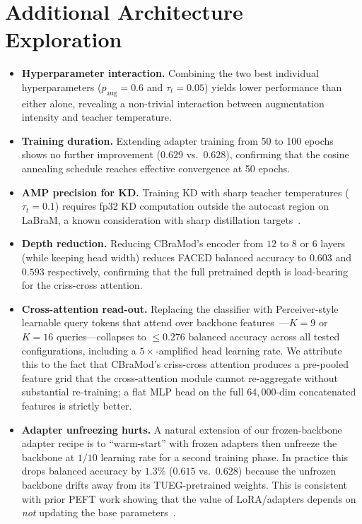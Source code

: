 \section{Additional Architecture Exploration}
\label{sec:supp_explore}

\begin{itemize}
    \item \textbf{Hyperparameter interaction.} Combining the two best individual hyperparameters ($p_{\text{aug}} = 0.6$ and $\tau_t = 0.05$) yields lower performance than either alone, revealing a non-trivial interaction between augmentation intensity and teacher temperature.
    \item \textbf{Training duration.} Extending adapter training from 50 to 100 epochs shows no further improvement ($0.629$ vs.\ $0.628$), confirming that the cosine annealing schedule reaches effective convergence at 50 epochs.
    \item \textbf{AMP precision for KD.} Training KD with sharp teacher temperatures ($\tau_t = 0.1$) requires fp32 KD computation outside the autocast region on LaBraM, a known consideration with sharp distillation targets~\cite{vitkd2022}.
    \item \textbf{Depth reduction.} Reducing CBraMod's encoder from $12$ to $8$ or $6$ layers (while keeping head width) reduces FACED balanced accuracy to $0.603$ and $0.593$ respectively, confirming that the full pretrained depth is load-bearing for the criss-cross attention.
    \item \textbf{Cross-attention read-out.} Replacing the classifier with Perceiver-style learnable query tokens that attend over backbone features~\cite{jaegle2021perceiver}---$K = 9$ or $K = 16$ queries---collapses to $\leq 0.276$ balanced accuracy across all tested configurations, including a $5\times$-amplified head learning rate. We attribute this to the fact that CBraMod's criss-cross attention produces a pre-pooled feature grid that the cross-attention module cannot re-aggregate without substantial re-training; a flat MLP head on the full $64{,}000$-dim concatenated features is strictly better.
    \item \textbf{Adapter unfreezing hurts.} A natural extension of our frozen-backbone adapter recipe is to ``warm-start'' with frozen adapters then unfreeze the backbone at $1/10$ learning rate for a second training phase. In practice this drops balanced accuracy by $1.3\%$ ($0.615$ vs.\ $0.628$) because the unfrozen backbone drifts away from its TUEG-pretrained weights. This is consistent with prior PEFT work showing that the value of LoRA/adapters depends on \emph{not} updating the base parameters~\cite{houlsby2019adapters,hu2022lora}.

\end{itemize}
